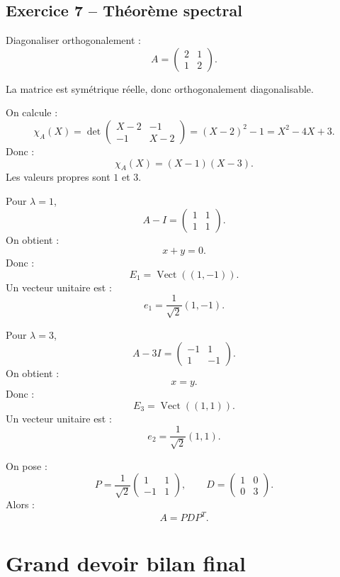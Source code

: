 \documentclass[11pt,a4paper]{article}
\newcommand{\Vect}{\operatorname{Vect}}
\begin{document}
\subsection*{Exercice 7 -- Théorème spectral}

\begin{exercicebox}
Diagonaliser orthogonalement :
\[
A=
\begin{pmatrix}
2&1\\
1&2
\end{pmatrix}.
\]
\end{exercicebox}

\begin{correctionbox}
La matrice est symétrique réelle, donc orthogonalement diagonalisable.

On calcule :
\[
\chi_A(X)
=
\det
\begin{pmatrix}
X-2&-1\\
-1&X-2
\end{pmatrix}
=
(X-2)^2-1
=
X^2-4X+3.
\]
Donc :
\[
\chi_A(X)=(X-1)(X-3).
\]
Les valeurs propres sont \(1\) et \(3\).

Pour \(\lambda=1\),
\[
A-I=
\begin{pmatrix}
1&1\\
1&1
\end{pmatrix}.
\]
On obtient :
\[
x+y=0.
\]
Donc :
\[
E_1=\Vect((1,-1)).
\]
Un vecteur unitaire est :
\[
e_1=\frac1{\sqrt2}(1,-1).
\]

Pour \(\lambda=3\),
\[
A-3I=
\begin{pmatrix}
-1&1\\
1&-1
\end{pmatrix}.
\]
On obtient :
\[
x=y.
\]
Donc :
\[
E_3=\Vect((1,1)).
\]
Un vecteur unitaire est :
\[
e_2=\frac1{\sqrt2}(1,1).
\]

On pose :
\[
P=
\frac1{\sqrt2}
\begin{pmatrix}
1&1\\
-1&1
\end{pmatrix},
\qquad
D=
\begin{pmatrix}
1&0\\
0&3
\end{pmatrix}.
\]
Alors :
\[
A=PDP^T.
\]
\end{correctionbox}

\newpage
\section{Grand devoir bilan final}
\end{document}
